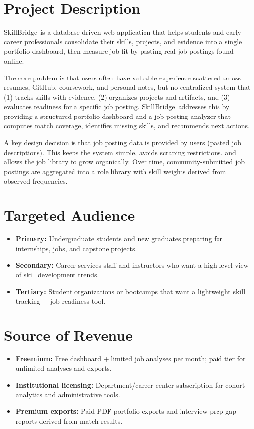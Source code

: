 \documentclass[11pt]{article}
\newcommand{\ProjectName}{SkillBridge} %
\begin{document}
\tableofcontents
\newpage

\section{Project Description} %
\ProjectName\ is a database-driven web application that helps students and early-career professionals
consolidate their skills, projects, and evidence into a single portfolio dashboard, then measure job fit
by pasting real job postings found online.

The core problem is that users often have valuable experience scattered across resumes, GitHub,
coursework, and personal notes, but no centralized system that (1) tracks skills with evidence,
(2) organizes projects and artifacts, and (3) evaluates readiness for a specific job posting.
\ProjectName\ addresses this by providing a structured portfolio dashboard and a job posting analyzer
that computes match coverage, identifies missing skills, and recommends next actions.

A key design decision is that job posting data is provided by users (pasted job descriptions).
This keeps the system simple, avoids scraping restrictions, and allows the job library to grow organically.
Over time, community-submitted job postings are aggregated into a role library with skill weights derived
from observed frequencies.

\section{Targeted Audience} %
\begin{itemize}[leftmargin=*]
  \item \textbf{Primary:} Undergraduate students and new graduates preparing for internships, jobs, and capstone projects.
  \item \textbf{Secondary:} Career services staff and instructors who want a high-level view of skill development trends.
  \item \textbf{Tertiary:} Student organizations or bootcamps that want a lightweight skill tracking + job readiness tool.
\end{itemize}

\section{Source of Revenue} %
\begin{itemize}[leftmargin=*]
  \item \textbf{Freemium:} Free dashboard + limited job analyses per month; paid tier for unlimited analyses and exports.
  \item \textbf{Institutional licensing:} Department/career center subscription for cohort analytics and administrative tools.
  \item \textbf{Premium exports:} Paid PDF portfolio exports and interview-prep gap reports derived from match results.
\end{itemize}
\end{document}

